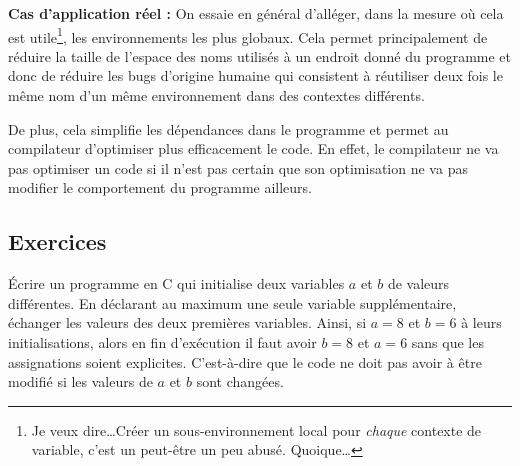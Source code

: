 \documentclass[../../../main.tex]{subfiles}
\begin{document}
\textbf{Cas d'application réel :} On essaie en général d'alléger, dans la mesure où cela est utile\footnote{Je veux dire\dots Créer un sous-environnement local pour \textit{chaque} contexte de variable, c'est un peut-être un peu abusé. Quoique\dots}, les environnements les plus globaux. Cela permet principalement de réduire la taille de l'espace des noms utilisés à un endroit donné du programme et donc de réduire les bugs d'origine humaine qui consistent à réutiliser deux fois le même nom d'un même environnement dans des contextes différents.

De plus, cela simplifie les dépendances dans le programme et permet au compilateur d'optimiser plus efficacement le code. En effet, le compilateur ne va pas optimiser un code si il n'est pas certain que son optimisation ne va pas modifier le comportement du programme ailleurs.
\subsection{Exercices}
 Écrire un programme en C qui initialise deux variables $a$ et $b$ de valeurs différentes. En déclarant au maximum une seule variable supplémentaire, échanger les valeurs des deux premières variables. Ainsi, si $a = 8$ et $b = 6$ à leurs initialisations, alors en fin d'exécution il faut avoir $b = 8$ et $a = 6$ sans que les assignations soient explicites. C'est-à-dire que le code ne doit pas avoir à être modifié si les valeurs de $a$ et $b$ sont changées.
\end{document}

